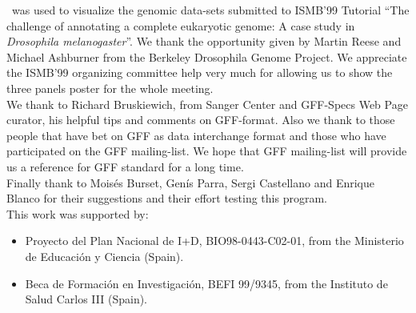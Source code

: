 %
%
%
%

\indent \prog\ was used to visualize the genomic data-sets submitted to ISMB'99 Tutorial ``The challenge of annotating a complete eukaryotic genome: A case study in \textit{Drosophila melanogaster}''.
We thank the opportunity given by Martin Reese and Michael Ashburner from the Berkeley Drosophila Genome Project. We appreciate the ISMB'99 organizing committee help very much for allowing us to show the three panels poster for the whole meeting.\\
\indent We thank to Richard Bruskiewich, from Sanger Center and GFF-Specs Web Page curator, his helpful tips and comments on GFF-format. Also we thank to those people that have bet on GFF as data interchange format and those who have participated on the GFF mailing-list. We hope that GFF mailing-list will provide us a reference for GFF standard for a long time.\\
\indent Finally thank to Mois\'es Burset, Gen\'is Parra, Sergi Castellano and Enrique Blanco for their suggestions and their effort testing this program.\\[1ex]
\indent This work was supported by:
\begin{itemize}
\item Proyecto del Plan Nacional de I+D, BIO98-0443-C02-01, from the Ministerio de Educaci\'on y Ciencia (Spain).
\item Beca de Formaci\'on en Investigaci\'on, BEFI 99/9345, from the Instituto de Salud Carlos III (Spain).
\end{itemize}
